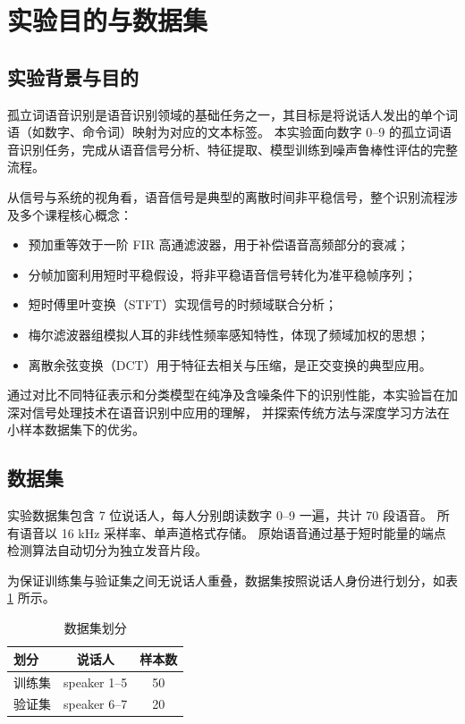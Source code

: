 \section{实验目的与数据集}

\subsection{实验背景与目的}

孤立词语音识别是语音识别领域的基础任务之一，其目标是将说话人发出的单个词语（如数字、命令词）映射为对应的文本标签。
本实验面向数字 0--9 的孤立词语音识别任务，完成从语音信号分析、特征提取、模型训练到噪声鲁棒性评估的完整流程。

从信号与系统的视角看，语音信号是典型的离散时间非平稳信号，整个识别流程涉及多个课程核心概念\cite{oppenheim1997signals}：
\begin{itemize}
  \item 预加重等效于一阶 FIR 高通滤波器，用于补偿语音高频部分的衰减；
  \item 分帧加窗利用短时平稳假设，将非平稳语音信号转化为准平稳帧序列；
  \item 短时傅里叶变换（STFT）实现信号的时频域联合分析；
  \item 梅尔滤波器组模拟人耳的非线性频率感知特性，体现了频域加权的思想；
  \item 离散余弦变换（DCT）用于特征去相关与压缩，是正交变换的典型应用。
\end{itemize}

通过对比不同特征表示和分类模型在纯净及含噪条件下的识别性能，本实验旨在加深对信号处理技术在语音识别中应用的理解，
并探索传统方法与深度学习方法在小样本数据集下的优劣。

\subsection{数据集}

实验数据集包含 7 位说话人，每人分别朗读数字 0--9 一遍，共计 70 段语音。
所有语音以 16 kHz 采样率、单声道格式存储。
原始语音通过基于短时能量的端点检测算法自动切分为独立发音片段。

为保证训练集与验证集之间无说话人重叠，数据集按照说话人身份进行划分，如表 \ref{tab:dataset} 所示。

\begin{table}[H]
  \centering
  \caption{数据集划分}
  \label{tab:dataset}
  \begin{tabular}{lcc}
    \toprule
    划分 & 说话人 & 样本数 \\
    \midrule
    训练集 & speaker 1--5 & 50 \\
    验证集 & speaker 6--7 & 20 \\
    \bottomrule
  \end{tabular}
\end{table}

